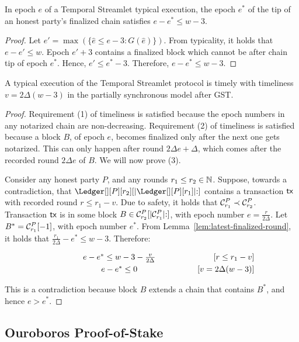 \begin{lemma} \label{lem:latest-finalized-round}
  In epoch $e$ of a Temporal Streamlet typical execution,
  the epoch $e^*$ of the tip of an honest party's finalized chain
  satisfies $e - e^* \leq w - 3$.
\end{lemma}
\begin{proof}
  Let $e' = \max(\{\hat e \leq e - 3: G(\hat e)\})$.
  From typicality, it holds that $e - e' \leq w$.
  Epoch $e' + 3$ contains a finalized block which cannot be after
  chain tip of epoch $e^*$.
  Hence, $e' \leq e^* - 3$.
  Therefore, $e - e^* \leq w - 3$.
  \Qed
\end{proof}


\begin{theorem}
  A typical execution of the Temporal Streamlet protocol is timely
  with timeliness $v = 2\Delta (w - 3)$ in the partially synchronous model after GST.
\end{theorem}
\begin{proof}
  Requirement (1) of timeliness is satisfied because the epoch numbers in any notarized chain
  are non-decreasing.
  Requirement (2) of timeliness is satisfied because a block $B$, of epoch $e$, becomes finalized
  only after the next one gets notarized. This can only happen after round $2\Delta e + \Delta$,
  which comes after the recorded round $2\Delta e$ of $B$.
  We will now prove (3).

  Consider any honest party $P$, and any rounds $r_1 \leq r_2 \in \mathbb{N}$.
  Suppose, towards a contradiction, that $\Ledger[][P][r_2][|\Ledger[][P][r_1]|{:}]$
  contains a transaction $\textsf{tx}$ with recorded round $r \leq r_1 - v$.
  Due to safety, it holds that $\mathcal{C}^P_{r_1} \prec \mathcal{C}^P_{r_2}$.
  Transaction $\textsf{tx}$ is in some block $B \in \mathcal{C}^P_{r_2}[|\mathcal{C}^P_{r_1}|{:}]$,
  with epoch number $e = \frac{r}{2\Delta}$.
  Let $B^* = \mathcal{C}^P_{r_1}[-1]$, with epoch number $e^*$.
  From Lemma~\ref{lem:latest-finalized-round}, it holds that
  $\frac{r_1}{2\Delta} - e^* \leq w - 3$. Therefore:

  \begin{align*}
    \makebox[0.5\textwidth][c]{$e - e^* \leq w - 3 - \frac{v}{2\Delta}$}         && \text{[$r \leq r_1 - v$]} \\
    \makebox[0.5\textwidth][c]{$e - e^* \leq 0$}                                 && \text{[$v = 2\Delta (w - 3)$]}
  \end{align*}

  This is a contradiction because block $B$ extends a chain that contains $B^*$,
  and hence $e > e^*$.

  \Qed
\end{proof}


\subsection{Ouroboros Proof-of-Stake}

